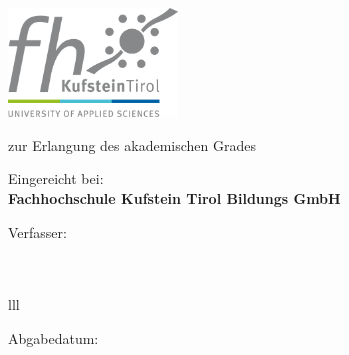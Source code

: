 \begin{titlepage}
 
    \vfill
    \begin{center}
      \includegraphics[width=4.5cm]{img/kufstein_logo.png} \\ 
    \end{center}
    \vfill
  
    \begin{center}
      \Large \textbf{\mytitle}
    \end{center} 
    \vfill
  
    \begin{center}
      \worktype
    \end{center}
    \vfill
  
    \begin{center}
      zur Erlangung des akademischen Grades\\
      \large \textbf{\academictitle}
    \end{center}
    \vfill
  
    \begin{center}
      Eingereicht bei:\\ 
      \vspace{0.1cm}
      \large \textbf{Fachhochschule Kufstein Tirol Bildungs GmbH}\\
      \vspace{0.1cm}
      \large \textbf{\studyprogram}
    \end{center}
    \vfill
  
    \begin{center}
      Verfasser:\\
      \vspace{0.1cm}
      \large \textbf{\myname}\\
      \vspace{0.1cm}
      \large \textbf{\mypkz}\\
    \end{center}
    \vfill
  
    \begin{center}
      \begin{tabular}{lll}
      \end{tabular}
    \end{center} 
    \vfill
  
    \begin{center}
      Abgabedatum: \\
      \vspace{0.1cm}
      \large \textbf{\mydate}
    \end{center} 
    \vfill  
  \end{titlepage}
